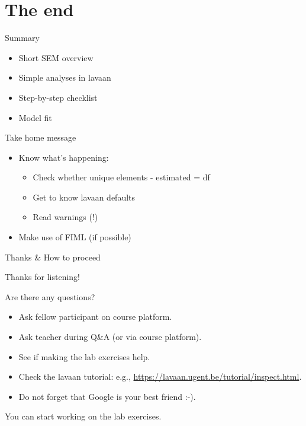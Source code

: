 \documentclass[10pt]{beamer}\usepackage[]{graphicx}\usepackage[]{xcolor}
\begin{document}
\section{The end}
%
%
\begin{frame}{Summary}

  \begin{itemize}
      \item Short SEM overview
      \item Simple analyses in lavaan
      \item Step-by-step checklist
      \item Model fit 
  \end{itemize}

\end{frame}
%
\begin{frame}{Take home message}
\begin{itemize}
\item{Know what's happening:} 
  \begin{itemize}
  \item{Check whether unique elements - estimated = df}
  \item{Get to know lavaan defaults}
  \item{Read warnings (!)}
  \end{itemize}
\item{Make use of FIML (if possible)}
\end{itemize}
\end{frame}
%
\begin{frame}{Thanks \& How to proceed}

Thanks for listening!

\vspace*{5mm}

Are there any questions?\\
\begin{itemize}
  \item Ask fellow participant on course platform.
  \item Ask teacher during Q\&A (or via course platform).
  \item See if making the lab exercises help.
  \item Check the lavaan tutorial: e.g., \url{https://lavaan.ugent.be/tutorial/inspect.html}.
  \item Do not forget that Google is your best friend :-).
\end{itemize}

\vspace*{5mm}

You can start working on the lab exercises.

\end{frame}
%
\end{document}
